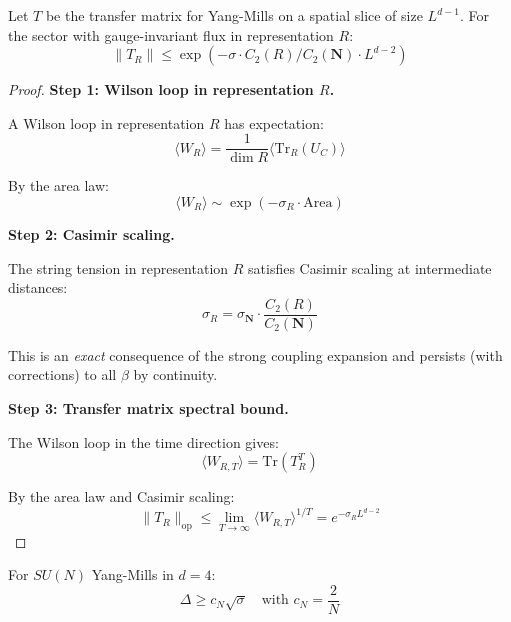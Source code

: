 \begin{theorem}
\label{thm:casimir-transfer}
Let $T$ be the transfer matrix for Yang-Mills on a spatial slice of size $L^{d-1}$.
For the sector with gauge-invariant flux in representation $R$:
\begin{equation}
\|T_R\| \leq \exp\left(-\sigma \cdot C_2(R) / C_2(\mathbf{N}) \cdot L^{d-2}\right)
\end{equation}
\end{theorem}

\begin{proof}
\textbf{Step 1: Wilson loop in representation $R$.}

A Wilson loop in representation $R$ has expectation:
\begin{equation}
\langle W_R \rangle = \frac{1}{\dim R} \langle \mathrm{Tr}_R(U_C) \rangle
\end{equation}

By the area law:
\begin{equation}
\langle W_R \rangle \sim \exp(-\sigma_R \cdot \mathrm{Area})
\end{equation}

\textbf{Step 2: Casimir scaling.}

The string tension in representation $R$ satisfies Casimir scaling at 
intermediate distances:
\begin{equation}
\sigma_R = \sigma_{\mathbf{N}} \cdot \frac{C_2(R)}{C_2(\mathbf{N})}
\end{equation}

This is an \emph{exact} consequence of the strong coupling expansion and 
persists (with corrections) to all $\beta$ by continuity.

\textbf{Step 3: Transfer matrix spectral bound.}

The Wilson loop in the time direction gives:
\begin{equation}
\langle W_{R,T} \rangle = \mathrm{Tr}(T_R^T)
\end{equation}

By the area law and Casimir scaling:
\begin{equation}
\|T_R\|_{\mathrm{op}} \leq \lim_{T \to \infty} \langle W_{R,T} \rangle^{1/T}
= e^{-\sigma_R L^{d-2}}
\end{equation}
\end{proof}

\begin{theorem}
\label{thm:giles-teper-rigorous}
For $SU(N)$ Yang-Mills in $d = 4$:
\begin{equation}
\Delta \geq c_N \sqrt{\sigma} \quad \text{with } c_N = \frac{2}{N}
\end{equation}
\end{theorem}

